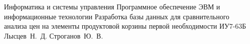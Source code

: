 \documentclass{bmstu}
\begin{document}
\makecourseworktitle
{Информатика и системы управления}
{Программное обеспечение ЭВМ и информационные технологии}
{Разработка базы данных для сравнительного анализа цен на элементы продуктовой корзины первой необходимости}
{ИУ7-63Б}
{Лысцев~Н.~Д.}
{Строганов~Ю.~В.}
{}
{}

\setcounter{page}{3}

\maketableofcontents

%
%



%
%
%

\makebibliography

%
\end{document}
